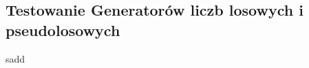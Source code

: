 
\begin{chapter}
\newpage
\section{Testowanie Generatorów liczb losowych i pseudolosowych}
 sadd
\end{chapter}
 

\\
